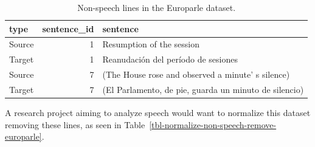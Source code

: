 \documentclass[
  letterpaper,
]{scrbook}
\begin{document}
\hypertarget{tbl-normalize-non-speech-identify-europarle}{}
\begin{table}
\caption{\label{tbl-normalize-non-speech-identify-europarle}Non-speech lines in the Europarle dataset. }\tabularnewline

\centering
\begin{tabular}{lrl}
\toprule
type & sentence\_id & sentence\\
\midrule
Source & 1 & Resumption of the session\\
Target & 1 & Reanudación del período de sesiones\\
Source & 7 & (The House rose and observed a minute' s silence)\\
Target & 7 & (El Parlamento, de pie, guarda un minuto de silencio)\\
\bottomrule
\end{tabular}
\end{table}

A research project aiming to analyze speech would want to normalize this
dataset removing these lines, as seen in
Table~\ref{tbl-normalize-non-speech-remove-europarle}.
\end{document}
